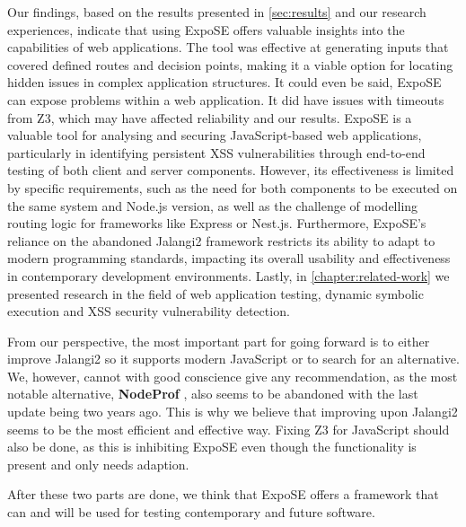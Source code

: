 Our findings, based on the results presented in \autoref{sec:results} and our research experiences, indicate that using ExpoSE offers valuable insights into the capabilities of web applications. 
The tool was effective at generating inputs that covered defined routes and decision points, making it a viable option for locating hidden issues in complex application structures. It could even be said, ExpoSE can expose problems within a web application. It did have issues with timeouts from Z3, which may have affected reliability and our results.
ExpoSE is a valuable tool for analysing and securing JavaScript-based web applications, particularly in identifying persistent XSS vulnerabilities through end-to-end testing of both client and server components. 
However, its effectiveness is limited by specific requirements, such as the need for both components to be executed on the same system and Node.js version, as well as the challenge of modelling routing logic for frameworks like Express or Nest.js. 
Furthermore, ExpoSE's reliance on the abandoned Jalangi2 framework restricts its ability to adapt to modern programming standards, impacting its overall usability and effectiveness in contemporary development environments.
Lastly, in \autoref{chapter:related-work} we presented research in the field of web application testing,  dynamic symbolic execution and XSS security vulnerability detection.

From our perspective, the most important part for going forward is to either improve Jalangi2 so it supports modern JavaScript or to search for an alternative. We, however, cannot with good conscience give any recommendation, as the most notable alternative, \textbf{NodeProf} \cite{sun_efficient_2018}, also seems to be abandoned with the last update being two years ago. This is why we believe that improving upon Jalangi2 seems to be the most efficient and effective way.
Fixing Z3 for JavaScript should also be done, as this is inhibiting ExpoSE even though the functionality is present and only needs adaption.

After these two parts are done, we think that ExpoSE offers a framework that can and will be used for testing contemporary and future software.






